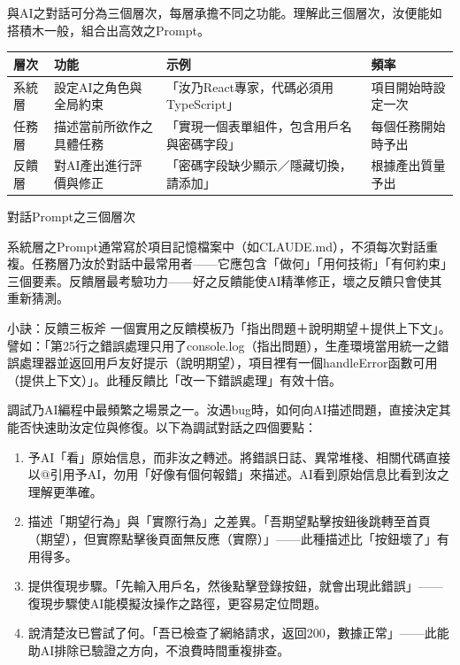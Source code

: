 


與AI之對話可分為三個層次，每層承擔不同之功能。理解此三個層次，汝便能如搭積木一般，組合出高效之Prompt。

\begin{center}
\begin{tabularx}{\linewidth}{|X|X|X|X|}
\hline
\textbf{層次} & \textbf{功能} & \textbf{示例} & \textbf{頻率} \tabularnewline
\hline
系統層 & 設定AI之角色與全局約束 & 「汝乃React專家，代碼必須用TypeScript」 & 項目開始時設定一次 \tabularnewline
任務層 & 描述當前所欲作之具體任務 & 「實現一個表單組件，包含用戶名與密碼字段」 & 每個任務開始時予出 \tabularnewline
反饋層 & 對AI產出進行評價與修正 & 「密碼字段缺少顯示／隱藏切換，請添加」 & 根據產出質量予出 \tabularnewline
\hline
\end{tabularx}
\end{center}

\begin{center}\small\color{gray}對話Prompt之三個層次\end{center}

系統層之Prompt通常寫於項目記憶檔案中（如CLAUDE.md），不須每次對話重複。任務層乃汝於對話中最常用者——它應包含「做何」「用何技術」「有何約束」三個要素。反饋層最考驗功力——好之反饋能使AI精準修正，壞之反饋只會使其重新猜測。

\begin{tcbinfo}{小訣：反饋三板斧}
一個實用之反饋模板乃「指出問題＋說明期望＋提供上下文」。譬如：「第25行之錯誤處理只用了console.log（指出問題），生產環境當用統一之錯誤處理器並返回用戶友好提示（說明期望），項目裡有一個handleError函數可用（提供上下文）」。此種反饋比「改一下錯誤處理」有效十倍。

\end{tcbinfo}


調試乃AI編程中最頻繁之場景之一。汝遇bug時，如何向AI描述問題，直接決定其能否快速助汝定位與修復。以下為調試對話之四個要點：

\begin{enumerate}
  \item 予AI「看」原始信息，而非汝之轉述。將錯誤日誌、異常堆棧、相關代碼直接以@引用予AI，勿用「好像有個何報錯」來描述。AI看到原始信息比看到汝之理解更準確。
  \item 描述「期望行為」與「實際行為」之差異。「吾期望點擊按鈕後跳轉至首頁（期望），但實際點擊後頁面無反應（實際）」——此種描述比「按鈕壞了」有用得多。
  \item 提供復現步驟。「先輸入用戶名，然後點擊登錄按鈕，就會出現此錯誤」——復現步驟使AI能模擬汝操作之路徑，更容易定位問題。
  \item 說清楚汝已嘗試了何。「吾已檢查了網絡請求，返回200，數據正常」——此能助AI排除已驗證之方向，不浪費時間重複排查。
\end{enumerate}

